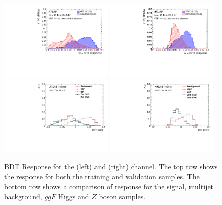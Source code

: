 \begin{figure}[htbp]
  \centering
 \includegraphics[width=0.48\textwidth]{figures/VBF/BDT_response_2cen.pdf}
 \includegraphics[width=0.48\textwidth]{figures/VBF/BDT_response_4cen.pdf}\\
 \includegraphics[width=0.48\textwidth]{figures/VBF/BDT_score_breakdown_2cen.pdf}
 \includegraphics[width=0.48\textwidth]{figures/VBF/BDT_score_breakdown_4cen.pdf}\\
\caption{BDT Response for  the \twocentral (left) and \fourcentral (right) channel.  The top row shows the response for both the training and validation samples.  The bottom row shows a comparison of response for the signal, multijet background, $ggF$ Higgs and $Z$ boson samples. }
  \label{fig:vbf-BDTResponse}
\end{figure}


